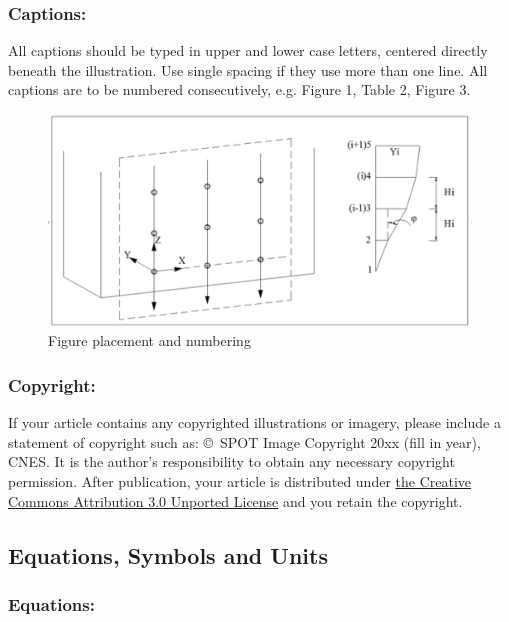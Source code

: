 \documentclass{isprs}
\begin{document}
\subsubsection{Captions:}\label{sec:Captions}

All captions should be typed in upper and lower case letters, 
centered directly beneath the illustration. Use single spacing if they 
use more than one line. All captions are to be numbered consecutively, 
e.g. Figure 1, Table 2, Figure 3.

\begin{figure}[ht!]
\begin{center}
		\includegraphics[width=1.0\columnwidth]{figures/test_sites/fig1.eps}
	\caption{Figure placement and numbering}
	\label{fig:figure_placement}
\end{center}
\end{figure}


\subsubsection{Copyright:}\label{sec:Copyright}

If your article contains any copyrighted illustrations or imagery, 
please include a statement of copyright such as: \copyright~SPOT Image Copyright 20xx 
(fill in year), CNES. It is the author's responsibility to obtain any necessary 
copyright permission. After publication, your article is distributed under \underline{the Creative 
Commons Attribution 3.0 Unported License} and you retain the copyright.


\subsection{Equations, Symbols and Units}\label{sec:Equations, Symbols and Units}

\subsubsection{Equations:}\label{sec:Equations}
\end{document}

